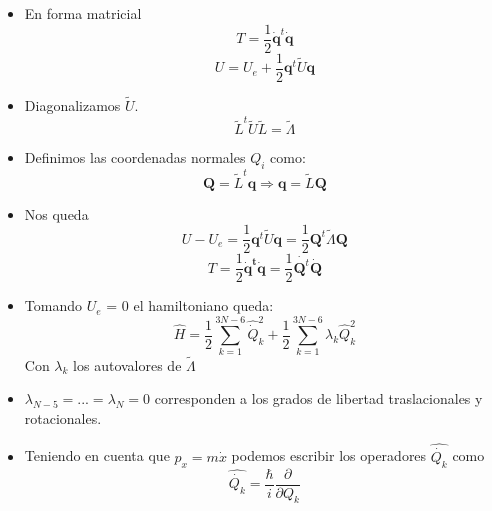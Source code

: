 \documentclass[a4paper]{beamer}
\begin{document}
\begin{frame}
\begin{itemize}
\item En forma matricial
\begin{equation*}
T=\frac{1}{2}\boldsymbol {\dot q}^t\boldsymbol {\dot q}
\end{equation*}
\begin{equation*}
U=U_e+\frac{1}{2}\boldsymbol q^t\tilde U\boldsymbol q
\end{equation*}
\item Diagonalizamos $\tilde U$.
\begin{equation*}
\tilde L^t\tilde U\tilde L = \tilde \Lambda
\end{equation*}
\item Definimos las coordenadas normales $Q_i$ como:
\begin{equation*}
\boldsymbol Q = \tilde L^t\boldsymbol q \Rightarrow \boldsymbol q = \tilde L\boldsymbol Q
\end{equation*}
\item Nos queda
\begin{equation*}
U-U_e=\frac{1}{2}\boldsymbol q^t\tilde U \boldsymbol q = \boxed{ \frac{1}{2}\boldsymbol Q^t\tilde \Lambda \boldsymbol Q}
\end{equation*}
\begin{equation*}
T=\frac{1}{2}\boldsymbol{\dot q^t \dot q}= \boxed{\frac{1}{2}\dot{\boldsymbol Q^t}\dot{\boldsymbol Q}}
\end{equation*}
\end{itemize}
\end{frame}

\begin{frame}
\begin{itemize}
\item Tomando $U_e$ = 0 el hamiltoniano queda:
\begin{equation*}
\hat H= \frac{1}{2}\sum_{k=1}^{3N-6} \hat{\dot Q}_k^2 + \frac{1}{2} \sum_{k=1}^{3N-6} \lambda_k \hat Q_k^2 
\end{equation*}
{\tiny Con $\lambda_k$ los autovalores de $\tilde \Lambda$}
\item $\lambda_{N-5}=...=\lambda_N=0$ corresponden a los grados de libertad traslacionales y rotacionales.
\item Teniendo en cuenta que $p_x=m\dot x$ podemos escribir los operadores $\hat{\dot{Q_k}}$ como
\begin{equation*}
\hat{\dot{Q_k}}=\frac{\hbar}{i}\frac{\partial}{\partial Q_k}
\end{equation*}

\end{itemize}
\end{frame}
\end{document}
